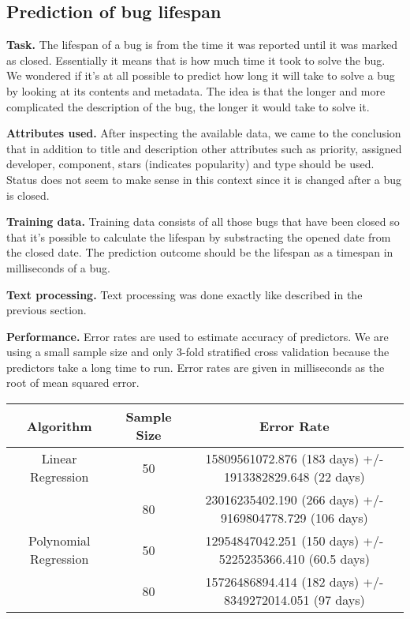 \subsection{Prediction of bug lifespan} %
\label{sub:Prediction of bug lifespan}

{\bf Task.} The lifespan of a bug is from the time it was reported until it was marked as closed. Essentially it means that is how much time it took to solve the bug. We wondered if it's at all possible to predict how long it will take to solve a bug by looking at its contents and metadata. The idea is that the longer and more complicated the description of the bug, the longer it would take to solve it.

{\bf Attributes used.} After inspecting the available data, we came to the conclusion that in addition to title and description other attributes such as priority, assigned developer, component, stars (indicates popularity) and type should be used. Status does not seem to make sense in this context since it is changed after a bug is closed.

{\bf Training data.} Training data consists of all those bugs that have been closed so that it's possible to calculate the lifespan by substracting the opened date from the closed date. The prediction outcome should be the lifespan as a timespan in milliseconds of a bug.

{\bf Text processing.} Text processing was done exactly like described in the previous section.

{\bf Performance.} Error rates are used to estimate accuracy of predictors. We are using a small sample size and only 3-fold stratified cross validation because the predictors take a long time to run. Error rates are given in milliseconds as the root of mean squared error.

\begin{tabular}{|c|c|c}
\hline
 Algorithm    & Sample Size &  Error Rate   \\
\hline
\hline
Linear Regression     &  50 & 15809561072.876 (183 days) +/- 1913382829.648 (22 days) \\
                      &  80 &  23016235402.190 (266 days) +/- 9169804778.729 (106 days) \\
Polynomial Regression &  50 &  12954847042.251 (150 days) +/- 5225235366.410 (60.5 days) \\
                      &  80 &  15726486894.414 (182 days) +/- 8349272014.051 (97 days) \\

\hline
\end{tabular}

